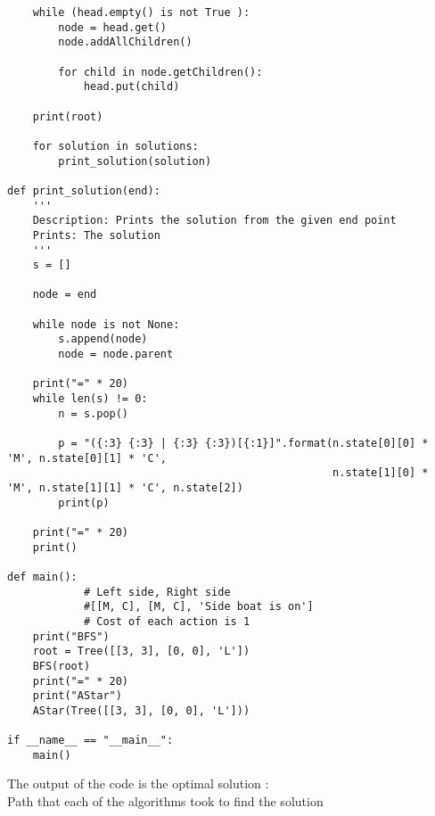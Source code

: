 \documentclass{article}
\begin{document}
\newpage
\begin{verbatim}
    while (head.empty() is not True ): 
        node = head.get()
        node.addAllChildren()
        
        for child in node.getChildren():
            head.put(child)

    print(root)
    
    for solution in solutions:
        print_solution(solution)
    
def print_solution(end):
    '''
    Description: Prints the solution from the given end point
    Prints: The solution
    '''
    s = []
    
    node = end

    while node is not None:
        s.append(node)
        node = node.parent

    print("=" * 20)
    while len(s) != 0:
        n = s.pop()

        p = "({:3} {:3} | {:3} {:3})[{:1}]".format(n.state[0][0] * 'M', n.state[0][1] * 'C', 
                                                   n.state[1][0] * 'M', n.state[1][1] * 'C', n.state[2])
        print(p)

    print("=" * 20)
    print()

def main():
            # Left side, Right side
            #[[M, C], [M, C], 'Side boat is on']
            # Cost of each action is 1
    print("BFS")
    root = Tree([[3, 3], [0, 0], 'L'])
    BFS(root)
    print("=" * 20)
    print("AStar")
    AStar(Tree([[3, 3], [0, 0], 'L']))

if __name__ == "__main__":
    main()
\end{verbatim}
The output of the code is the optimal solution : \\
Path that each of the algorithms took to find the solution
\end{document}
